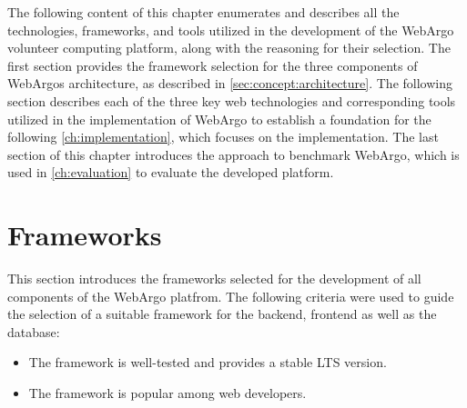The following content of this chapter enumerates and describes all the technologies, frameworks, and tools utilized in the development of the WebArgo volunteer computing platform, along with the reasoning for their selection. The first section provides the framework selection for the three components of WebArgos architecture, as described in \autoref{sec:concept:architecture}. The following section describes each of the three key web technologies and corresponding tools utilized in the implementation of WebArgo to establish a foundation for the following \autoref{ch:implementation}, which focuses on the implementation. The last section of this chapter introduces the approach to benchmark WebArgo, which is used in \autoref{ch:evaluation} to evaluate the developed platform.

\section{Frameworks}
\label{sec:methodology:frameworks}
This section introduces the frameworks selected for the development of all components of the WebArgo platfrom. The following criteria were used to guide the selection of a suitable framework for the backend, frontend as well as the database:
\begin{itemize}
    \item The framework is well-tested and provides a stable \ac{LTS} version.
    \item The framework is popular among web developers.
\end{itemize}

